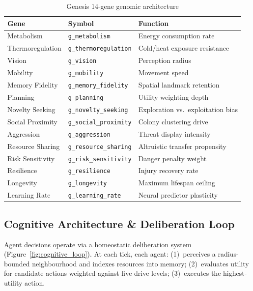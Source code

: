 \documentclass[12pt,a4paper]{article}
\begin{document}
\begin{table}[h]
\centering
\caption{Genesis 14-gene genomic architecture}
\label{tab:genome}
\begin{tabularx}{\linewidth}{l l X}
\toprule
\textbf{Gene} & \textbf{Symbol} & \textbf{Function} \\
\midrule
Metabolism & \texttt{g\_metabolism} & Energy consumption rate \\
Thermoregulation & \texttt{g\_thermoregulation} & Cold/heat exposure resistance \\
Vision & \texttt{g\_vision} & Perception radius \\
Mobility & \texttt{g\_mobility} & Movement speed \\
Memory Fidelity & \texttt{g\_memory\_fidelity} & Spatial landmark retention \\
Planning & \texttt{g\_planning} & Utility weighting depth \\
Novelty Seeking & \texttt{g\_novelty\_seeking} & Exploration vs.\ exploitation bias \\
Social Proximity & \texttt{g\_social\_proximity} & Colony clustering drive \\
Aggression & \texttt{g\_aggression} & Threat display intensity \\
Resource Sharing & \texttt{g\_resource\_sharing} & Altruistic transfer propensity \\
Risk Sensitivity & \texttt{g\_risk\_sensitivity} & Danger penalty weight \\
Resilience & \texttt{g\_resilience} & Injury recovery rate \\
Longevity & \texttt{g\_longevity} & Maximum lifespan ceiling \\
Learning Rate & \texttt{g\_learning\_rate} & Neural predictor plasticity \\
\bottomrule
\end{tabularx}
\end{table}

\subsection{Cognitive Architecture \& Deliberation Loop}

Agent decisions operate via a homeostatic deliberation system (Figure~\ref{fig:cognitive_loop}). At each tick, each agent: (1)~perceives a radius-bounded neighbourhood and indexes resources into memory; (2)~evaluates utility for candidate actions weighted against five drive levels; (3)~executes the highest-utility action.
\end{document}
